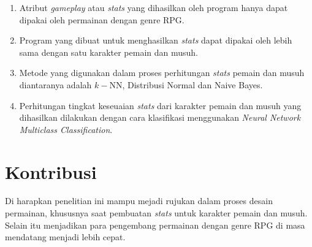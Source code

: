 \begin{enumerate}
	\item Atribut \textit{gameplay} atau \textit{stats} yang dihasilkan oleh program hanya dapat dipakai oleh permainan dengan genre RPG.
	
	\item Program yang dibuat untuk menghasilkan \textit{stats} dapat dipakai oleh lebih sama dengan satu karakter pemain dan musuh.

	\item Metode yang digunakan dalam proses perhitungan \textit{stats} pemain dan musuh diantaranya adalah $k-$NN, Distribusi Normal dan Naive Bayes.
	
	\item Perhitungan tingkat keseuaian \textit{stats} dari karakter pemain dan musuh yang dihasilkan dilakukan dengan cara klasifikasi menggunakan \textit{Neural Network Multiclass Classification}.
\end{enumerate}

\section{Kontribusi}
\vspace{1ex}

Di harapkan penelitian ini mampu mejadi rujukan dalam proses desain permainan, khususnya saat pembuatan \textit{stats} untuk karakter pemain dan musuh. Selain itu menjadikan para pengembang permainan dengan genre RPG di masa mendatang menjadi lebih cepat.
